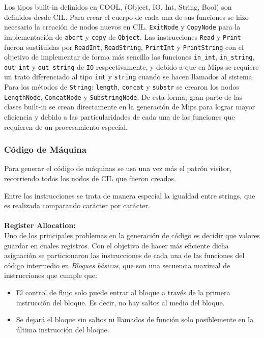 \documentclass[11pt]{scrartcl} %
\begin{document}
Los tipos built-in definidos en COOL, (Object, IO, Int, String, Bool) son definidos desde CIL. Para crear el cuerpo de cada una de sus funciones se hizo necesario la creación de nodos nuevos en CIL. \texttt{ExitNode} y \texttt{CopyNode} para la implementación de \texttt{abort} y \texttt{copy} de \texttt{Object}. Las instrucciones \texttt{Read} y \texttt{Print} fueron sustituidas por \texttt{ReadInt}, \texttt{ReadString}, \texttt{PrintInt} y \texttt{PrintString} con el objetivo de implementar de forma más sencilla las funciones \texttt{in\_int}, \texttt{in\_string}, \texttt{out\_int} y \texttt{out\_string} de \texttt{IO} respectivamente, y debido a que en Mips se requiere un trato diferenciado al tipo \texttt{int} y \texttt{string} cuando se hacen llamados al sistema. Para los métodos de \texttt{String}: \texttt{length}, \texttt{concat} y \texttt{substr} se crearon los nodos \texttt{LengthNode}, \texttt{ConcatNode} y \texttt{SubstringNode}. De esta forma, gran parte de las clases built-in se crean directamente en la generación de Mips para lograr mayor eficiencia y debido a las particularidades de cada una de las funciones que requieren de un procesamiento especial. 

\subsubsection{Código de Máquina}

Para generar el código de máquinas se usa una vez más el patrón visitor, recorriendo todos los nodos de CIL que fueron creados.

Entre las instrucciones se trata de manera especial la igualdad entre strings, que es realizada comparando carácter por carácter.\\\\

\textbf{Register Allocation:}\\

Uno de los principales problemas en la generación de código es decidir que valores guardar en cuales registros. Con el objetivo de hacer más eficiente dicha asignación se particionaron las instrucciones de cada una de las funciones del código intermedio en \textit{Bloques básicos}, que son una secuencia maximal de instrucciones que cumple que:
\begin{itemize}
	\item El control de flujo solo puede entrar al bloque a través de la primera instrucción del bloque. Es decir, no hay saltos al medio del bloque.
	\item Se dejará el bloque sin saltos ni llamados de función solo posiblemente en la última instrucción del bloque.
\end{itemize}
\end{document}

